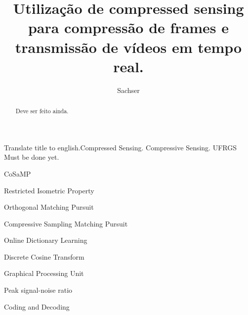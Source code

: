 \documentclass[cic,tc]{iiufrgs}
\title{Utilização de compressed sensing para compressão de frames e transmissão de vídeos em tempo real.}
\author{Sachser}{Eduardo}
\begin{document}
\maketitle





\begin{abstract}
    Deve ser feito ainda.
\end{abstract}

\begin{englishabstract}{Translate title to english.}{Compressed Sensing. Compressive Sensing. UFRGS}
    Must be done yet.
\end{englishabstract}

\listoffigures

\listoftables

\begin{listofabbrv}{CoSaMP}
    \item[RIP] Restricted Isometric Property
    \item[OMP] Orthogonal Matching Pursuit
    \item[CoSaMP] Compressive Sampling Matching Pursuit 
    \item[ODL] Online Dictionary Learning 
    \item[DCT] Discrete Cosine Transform 
    \item[GPU] Graphical Processing Unit
    \item[PSNR] Peak signal-noise ratio 
    \item[CoDec] Coding and Decoding  
\end{listofabbrv}
\end{document}
